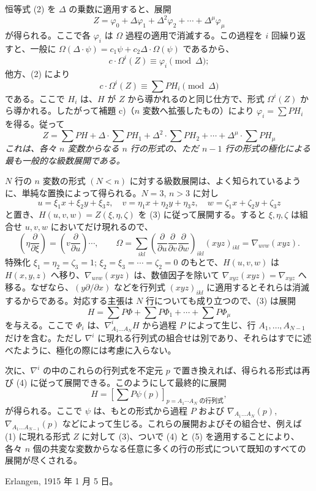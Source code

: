 \documentclass[11pt]{article}
\begin{document}
恒等式 (2) を $\Delta$ の乗数に適用すると、展開
\[
  Z=\varphi_0+\Delta\varphi_1+\Delta^2\varphi_2+\cdots+\Delta^\mu\varphi_\mu
\]
が得られる。ここで各 $\varphi_i$ は $\Omega$ 過程の適用で消滅する。この過程を $i$ 回繰り返すと、一般に $\Omega(\Delta\cdot\psi)=c_1\psi+c_2\Delta\cdot\Omega(\psi)$ であるから、
\[
  c\cdot \Omega^i(Z)\equiv\varphi_i\pmod{\Delta};
\]
他方、(2) により
\[
  c\cdot\Omega^i(Z)\equiv\sum PH_i\pmod{\Delta}
\]
である。ここで $H_i$ は、$H$ が $Z$ から導かれるのと同じ仕方で、形式 $\Omega^i(Z)$ から導かれる。したがって補題 c)（$n$ 変数へ拡張したもの）により $\varphi_i=\sum PH_i$ を得る。従って
\begin{equation}
  Z=\sum PH+\Delta\cdot\sum PH_1+\Delta^2\cdot\sum PH_2+
  \cdots+\Delta^\mu\cdot\sum PH_\mu
\tag{3}
\end{equation}
\emph{これは、各々 $n$ 変数からなる $n$ 行の形式の、ただ $n-1$ 行の形式の極化による最も一般的な級数展開である。}

$N$ 行の $n$ 変数の形式 $(N<n)$ に対する級数展開は、よく知られているように、単純な置換によって得られる。$N=3$, $n>3$ に対し
\[
  u=\xi_1x+\xi_2y+\xi_3z,
  \quad v=\eta_1x+\eta_2y+\eta_3z,
  \quad w=\zeta_1x+\zeta_2y+\zeta_3z
\]
と置き、$H(u,v,w)=Z(\xi,\eta,\zeta)$ を (3) に従って展開する。すると $\xi,\eta,\zeta$ は組合せ $u,v,w$ においてだけ現れるので、
\[
  \left(\eta\frac{\partial}{\partial \xi}\right)=
  \left(v\frac{\partial}{\partial u}\right)\cdots,
  \qquad
  \Omega=\sum_{ikl}\left(\frac{\partial}{\partial u}
  \frac{\partial}{\partial v}
  \frac{\partial}{\partial w}\right)_{ikl}(xyz)_{ikl}
  =\nabla_{uvw}(xyz).
\]
特殊化 $\xi_1=\eta_2=\zeta_3=1$; $\xi_2=\xi_3=\cdots=\zeta_2=0$ のもとで、$H(u,v,w)$ は $H(x,y,z)$ へ移り、$\nabla_{uvw}(xyz)$ は、数値因子を除いて $\nabla_{xyz}(xyz)=\nabla_{xyz}$ へ移る。なぜなら、$(y\partial/\partial x)$ などを行列式 $(xyz)_{ikl}$ に適用するとそれらは消滅するからである。対応する主張は $N$ 行についても成り立つので、(3) は展開
\begin{equation}
  H=\sum P\Phi+\sum P\Phi_1+\cdots+\sum P\Phi_\mu
\tag{4}
\end{equation}
を与える。ここで $\Phi_i$ は、$\nabla^i_{A_1\ldots A_N}H$ から過程 $P$ によって生じ、行 $A_1,
\ldots,A_{N-1}$ だけを含む。ただし $\nabla^i$ に現れる行列式の組合せは別であり、それらはすでに述べたように、極化の際には考慮に入らない。

次に、$\nabla^i$ の中のこれらの行列式を不定元 $p$ で置き換えれば、得られる形式は再び (4) に従って展開できる。このようにして最終的に展開
\begin{equation}
  H=\left[\sum P\psi(p)\right]_{p=\text{$A_1\cdots A_N$ の行列式}},
\tag{5}
\end{equation}
が得られる。ここで $\psi$ は、もとの形式から過程 $P$ および $\nabla_{A_1\ldots A_N}(p)$, $\nabla_{A_1\ldots A_{N-1}}(p)$ などによって生じる。これらの展開およびその組合せ、例えば (1) に現れる形式 $Z$ に対して (3)、ついで (4) と (5) を適用することにより、各々 $n$ 個の共変な変数からなる任意に多くの行の形式について既知のすべての展開が尽くされる。

Erlangen, 1915 年 1 月 5 日。
\end{document}
